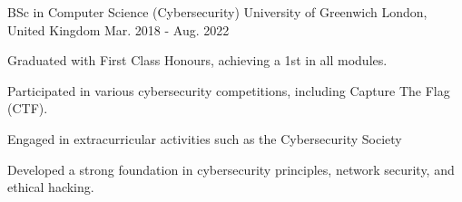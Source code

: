 

\begin{cventries}

  \cventry
    {BSc in Computer Science (Cybersecurity)} %
    {University of Greenwich} %
    {London, United Kingdom} %
    {Mar. 2018 - Aug. 2022} %
    {
      \begin{cvitems} %
        \item {Graduated with First Class Honours, achieving a 1st in all modules.}
        \item {Participated in various cybersecurity competitions, including Capture The Flag (CTF).}
        \item {Engaged in extracurricular activities such as the Cybersecurity Society}
        \item {Developed a strong foundation in cybersecurity principles, network security, and ethical hacking.}
      \end{cvitems}
    }

\end{cventries}
